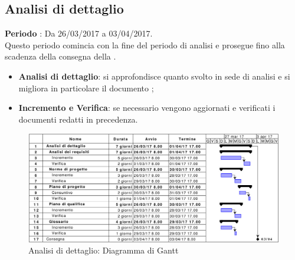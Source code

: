 \documentclass[../PianoDiProgetto.tex]{subfiles}
\begin{document}
			
			
		\subsection{Analisi di dettaglio}
		\textbf{Periodo} : Da 26/03/2017 a 03/04/2017. \\
		Questo periodo comincia con la fine del periodo di analisi e prosegue fino alla scadenza della consegna della \revisionedeirequisiti.
		\begin{itemize}
			\item \textbf{Analisi di dettaglio}: si approfondisce quanto svolto in sede di analisi e si migliora in particolare il documento \analisideirequisiti;
			\item \textbf{Incremento e Verifica}: se necessario vengono aggiornati e verificati i documenti redatti in precedenza.
		\end{itemize}
		\begin{figure}[H]
			\centering
			\includegraphics[scale=0.55]{Figures/Gantt_AnalisiDettaglio.jpg}
			\caption{Analisi di dettaglio: Diagramma di Gantt}
		\end{figure}
	
	
	
\end{document}
